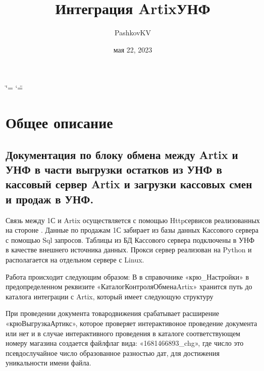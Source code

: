 \documentclass[letterpaper,10pt,russian]{sphinxmanual}
\title{Интеграция Artix\sphinxhyphen{}УНФ}
\date{мая 22, 2023}
\author{PashkovKV}
\begin{document}
\ifdefined\shorthandoff
  \ifnum\catcode`\=\string=\active\shorthandoff{=}\fi
  \ifnum\catcode`\"=\active{}\fi
\fi

\pagestyle{empty}
\sphinxmaketitle
\pagestyle{plain}
\sphinxtableofcontents
\pagestyle{normal}
\label{\detokenize{index::doc}}


\sphinxstepscope


\chapter{Общее описание}
\label{\detokenize{description:id1}}\label{\detokenize{description::doc}}

\section{Документация по блоку обмена между Artix и УНФ в части выгрузки остатков из УНФ в кассовый сервер Artix и загрузки кассовых смен и продаж в УНФ.}
\label{\detokenize{description:artix-artix}}
\sphinxAtStartPar
Связь между 1С и Artix осуществляется с помощью Http\sphinxhyphen{}сервисов реализованных на стороне . Данные по продажам 1С забирает из базы данных
Кассового сервера с помощью Sql запросов. Таблицы из БД Кассового сервера подключены в УНФ в качестве внешнего источника данных.
Прокси сервер реализован на Python и располагается на отдельном сервере с Linux.

\begin{figure}[htbp]
\centering

\noindent{}
\end{figure}

\sphinxAtStartPar
Работа происходит следующим образом:
В  в справочнике «крю\_Настройки» в предопределенном реквизите «КаталогКонтроляОбменаArtix» хранится путь до каталога интеграции
с Artix, который имеет следующую структуру \sphinxhyphen{}

\begin{figure}[htbp]
\centering

\noindent{}
\end{figure}

\sphinxAtStartPar
При проведении документа товародвижения срабатывает расширение «крюВыгрузкаАртикс», которое проверяет интерактивоное проведение документа или нет и в случае
интерактивного проведения в каталоге соответствующем номеру магазина создается файл\sphinxhyphen{}флаг
вида:  «1681466893\_chg», где число это псевдослучайное число образованное разностью дат, для достижения уникальности имени файла.
\end{document}
